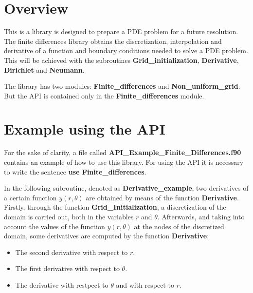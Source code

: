 \section{Overview}

This is a library is designed to prepare a PDE problem for a future resolution. The finite differences library obtains the discretization, interpolation and derivative of a function and boundary conditions needed to solve a PDE problem. This will be achieved with the subroutines \textbf{Grid\_initialization}, \textbf{Derivative}, \textbf{Dirichlet} and \textbf{Neumann}. 


The library has two modules: \textbf{Finite\_differences} and \textbf{Non\_uniform\_grid}. But the API is contained only in the \textbf{Finite\_differences} module.


\section{Example using the API}

For the sake of clarity, a file called \textbf{API\_Example\_Finite\_Differences.f90} contains an example of how to use this library. For using the API it is necessary to write the sentence \textbf{use Finite\_differences}.

In the following subroutine, denoted as \textbf{Derivative\_example}, two derivatives of a certain function $y(r,\theta)$ are obtained by means of the function \textbf{Derivative}. Firstly, through the function \textbf{Grid\_Initialization}, a discretization of the domain is carried out, both in the variables $r$ and $\theta$. Afterwards, and taking into account the values of the function $y(r,\theta)$ at the nodes of the discretized domain, some derivatives are computed by the function \textbf{Derivative}:

\begin{itemize}
	\item The second derivative with respect to $r$.
	\item The first derivative with respect to $\theta$.
	\item The derivative with restpect to $\theta$ and with respect to $r$.
\end{itemize}

\newpage

\par\vspace{\baselineskip}
\lstset{language=Fortran}


